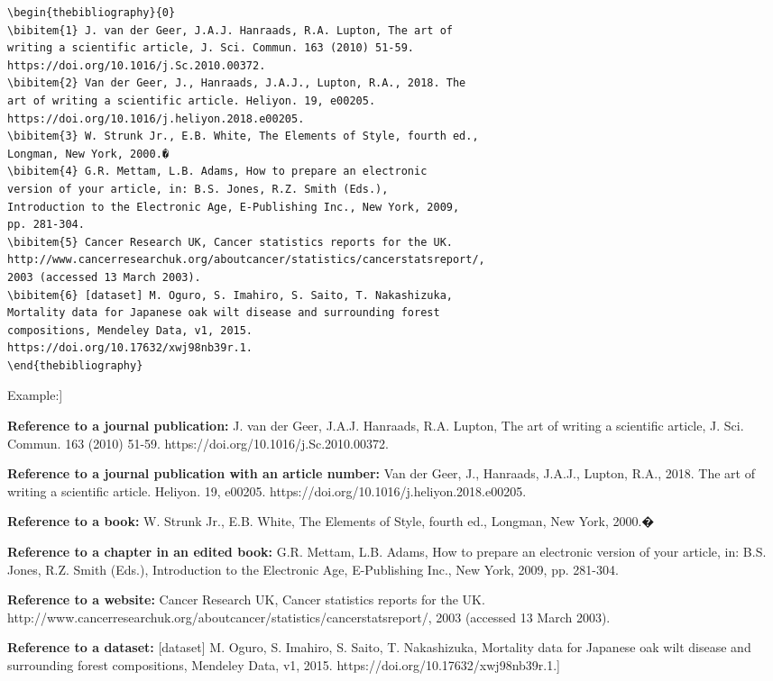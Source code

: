\documentclass[times,final]{elsarticle.cls}
\begin{document}
{\small
\begin{verbatim}
\begin{thebibliography}{0}
\bibitem{1} J. van der Geer, J.A.J. Hanraads, R.A. Lupton, The art of
writing a scientific article, J. Sci. Commun. 163 (2010) 51-59.
https://doi.org/10.1016/j.Sc.2010.00372.
\bibitem{2} Van der Geer, J., Hanraads, J.A.J., Lupton, R.A., 2018. The
art of writing a scientific article. Heliyon. 19, e00205.
https://doi.org/10.1016/j.heliyon.2018.e00205.
\bibitem{3} W. Strunk Jr., E.B. White, The Elements of Style, fourth ed., 
Longman, New York, 2000.�
\bibitem{4} G.R. Mettam, L.B. Adams, How to prepare an electronic
version of your article, in: B.S. Jones, R.Z. Smith (Eds.),
Introduction to the Electronic Age, E-Publishing Inc., New York, 2009,
pp. 281-304.
\bibitem{5} Cancer Research UK, Cancer statistics reports for the UK.
http://www.cancerresearchuk.org/aboutcancer/statistics/cancerstatsreport/, 
2003 (accessed 13 March 2003).
\bibitem{6} [dataset] M. Oguro, S. Imahiro, S. Saito, T. Nakashizuka,
Mortality data for Japanese oak wilt disease and surrounding forest
compositions, Mendeley Data, v1, 2015.
https://doi.org/10.17632/xwj98nb39r.1.
\end{thebibliography}
\end{verbatim}
}

\noindent Example:]
\vspace*{-12pt}

\begin{thebibliography}{0}
\item[] \textbf{Reference to a journal publication:}
 J. van der Geer, J.A.J. Hanraads, R.A. Lupton, The art of
writing a scientific article, J. Sci. Commun. 163 (2010) 51-59.
https://doi.org/10.1016/j.Sc.2010.00372.

\textbf{Reference to a journal publication with an article number:}
 Van der Geer, J., Hanraads, J.A.J., Lupton, R.A., 2018. The
art of writing a scientific article. Heliyon. 19, e00205.
https://doi.org/10.1016/j.heliyon.2018.e00205.

\textbf{Reference to a book:}
 W. Strunk Jr., E.B. White, The Elements of Style, fourth ed., Longman, New York, 2000.�

\textbf{Reference to a chapter in an edited book:}
 G.R. Mettam, L.B. Adams, How to prepare an electronic
version of your article, in: B.S. Jones, R.Z. Smith (Eds.),
Introduction to the Electronic Age, E-Publishing Inc., New York, 2009,
pp. 281-304.

\textbf{Reference to a website:}
 Cancer Research UK, Cancer statistics reports for the UK.\newline
http://www.cancerresearchuk.org/aboutcancer/statistics/cancerstatsreport/, 2003 (accessed 13 March 2003).

\textbf{Reference to a dataset:}
 [dataset] M. Oguro, S. Imahiro, S. Saito, T. Nakashizuka,
Mortality data for Japanese oak wilt disease and surrounding forest
compositions, Mendeley Data, v1, 2015.
https://doi.org/10.17632/xwj98nb39r.1.] 
\end{thebibliography}
\end{document}
